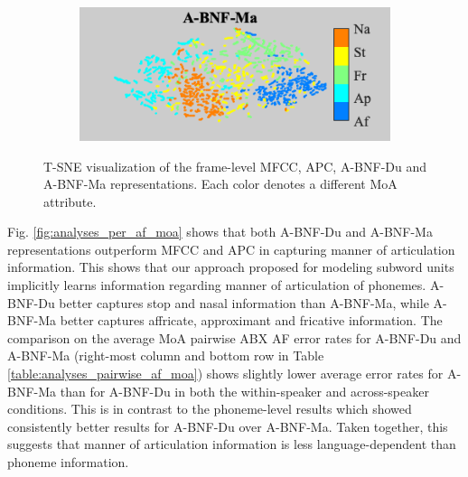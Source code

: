 \documentclass[transmag]{IEEEtran}
\begin{document}
\begin{figure}[!t]
\begin{subfigure}{0.49\linewidth}
    \end{subfigure}    \begin{subfigure}{0.49\linewidth}
	   \centering
	   \includegraphics[width=1\linewidth]{Rtsne_af_moa_bnf_aidatatang_apc_input_disc_bar_adjust_journal.png}
    \end{subfigure}
    \caption{T-SNE visualization of the frame-level MFCC, APC, A-BNF-Du and A-BNF-Ma representations. Each color denotes a different MoA attribute.}
    \label{fig:analysis_tsne_moa}
\end{figure}

Fig. \ref{fig:analyses_per_af_moa} shows that both A-BNF-Du and A-BNF-Ma representations outperform MFCC and APC in capturing manner of articulation information. This shows that our approach proposed for modeling subword units implicitly learns information regarding  manner of articulation of phonemes. A-BNF-Du better captures stop and nasal information than A-BNF-Ma, while A-BNF-Ma better captures affricate, approximant and fricative information. The comparison on the average MoA pairwise ABX AF error rates for A-BNF-Du and A-BNF-Ma (right-most column and bottom row in Table \ref{table:analyses_pairwise_af_moa}) shows slightly lower average error rates for A-BNF-Ma than for A-BNF-Du in both the within-speaker and across-speaker conditions. This is in contrast to the phoneme-level results which showed consistently better results for A-BNF-Du over A-BNF-Ma. Taken together, this suggests that manner of articulation information is less language-dependent than phoneme information.
\end{document}
